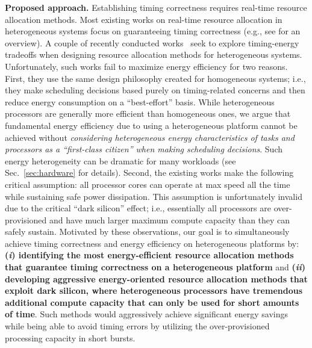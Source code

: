\vspace{2mm} \noindent \textbf{Proposed approach.} Establishing timing correctness requires real-time resource allocation methods. Most existing works on real-time resource allocation in heterogeneous systems focus on guaranteeing timing correctness (e.g., see \cite{raravi2014task, raravi2013assigning, niemeier2011partitioned} for an overview). %
 A couple of recently conducted works~\cite{liuenergy, colin2014energy} seek to explore timing-energy tradeoffs when designing resource allocation methods for heterogeneous systems. 
 Unfortunately, such works fail to maximize energy efficiency for two reasons. First, they use the same design philosophy created for homogeneous systems; i.e., they make scheduling decisions based purely on timing-related concerns and then reduce energy consumption on a ``best-effort'' basis. While heterogeneous processors are generally more efficient than homogeneous ones, we argue that fundamental energy efficiency due to using a heterogeneous platform cannot be achieved without \textit{considering heterogeneous energy characteristics of tasks and processors as a ``first-class citizen'' when making scheduling decisions}. Such energy heterogeneity can be dramatic for many workloads (see Sec.~\ref{sec:hardware} for details). Second, the existing works make the following critical assumption: all processor cores can operate at max speed all the time while sustaining safe power dissipation.
  This assumption is unfortunately invalid due to the critical ``dark silicon'' effect; i.e., essentially all processors are over-provisioned and have much larger maximum compute capacity than they can safely sustain\cite{?}. Motivated by these observations, our goal is to simultaneously achieve timing correctness and energy efficiency on heterogeneous platforms by: \textbf{(\textit{i}) identifying the most energy-efficient resource allocation methods that guarantee timing correctness on a heterogeneous platform} and
   \textbf{(\textit{ii}) developing aggressive energy-oriented resource allocation methods that exploit dark silicon, where heterogeneous processors have tremendous additional compute capacity that can only be used for short amounts of time}. Such methods would aggressively achieve significant energy savings while being able to avoid timing errors by utilizing the over-provisioned processing capacity in short bursts.



